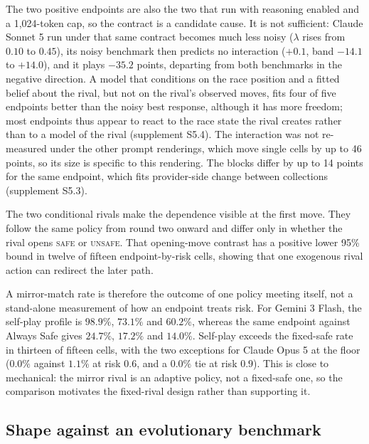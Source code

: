 \documentclass{article}
\newcommand{\Safe}{\textsc{safe}}
\newcommand{\Unsafe}{\textsc{unsafe}}
\begin{document}
The two positive endpoints are also the two that run with reasoning enabled and
a 1{,}024-token cap, so the contract is a candidate cause. It is not sufficient:
Claude Sonnet 5 run under that same contract becomes much less noisy ($\lambda$
rises from $0.10$ to $0.45$), its noisy benchmark then predicts no interaction
($+0.1$, band $-14.1$ to $+14.0$), and it plays $-35.2$ points, departing from
both benchmarks in the negative direction. A model that conditions on the race
position and a fitted belief about the rival, but not on the rival's observed
moves, fits four of five endpoints better than the noisy best response,
although it has more freedom; most endpoints thus appear to react to the race
state the rival creates rather than to a model of the rival (supplement S5.4).
The interaction was not re-measured under the other prompt renderings, which
move single cells by up to 46 points, so its size is specific to this
rendering. The blocks differ by up to 14 points for the same endpoint, which
fits provider-side change between collections (supplement S5.3).

The two conditional rivals make the dependence visible at the first move. They
follow the same policy from round two onward and differ only in whether the rival
opens \Safe{} or \Unsafe{}. That opening-move contrast has a positive lower 95\%
bound in twelve of fifteen endpoint-by-risk cells, showing that one exogenous
rival action can redirect the later path.

A mirror-match rate is therefore the outcome of one policy meeting itself,
not a stand-alone measurement of how an endpoint treats risk. For Gemini 3
Flash, the self-play profile is $98.9\%$, $73.1\%$ and $60.2\%$, whereas the
same endpoint against Always Safe gives $24.7\%$, $17.2\%$ and $14.0\%$.
Self-play exceeds the fixed-safe rate in thirteen of fifteen cells, with the two
exceptions for Claude Opus 5 at the floor ($0.0\%$ against $1.1\%$ at risk
$0.6$, and a $0.0\%$ tie at risk $0.9$). This is close to mechanical: the mirror
rival is an adaptive policy, not a fixed-safe one, so the comparison motivates
the fixed-rival design rather than supporting it.




\subsection{Shape against an evolutionary benchmark}
\label{sec:results-theory}
\end{document}
